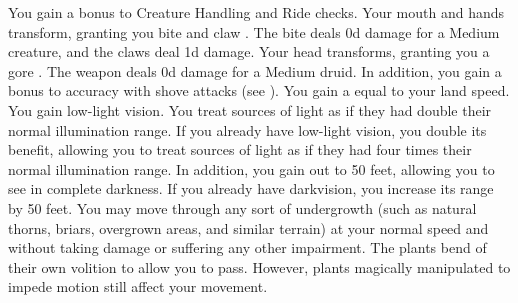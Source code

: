         You gain a  bonus to Creature Handling and Ride checks.
        Your mouth and hands transform, granting you bite and claw .
        The bite deals \plus0d damage for a Medium creature, and the claws deal \minus1d damage.
        Your head transforms, granting you a gore .
        The weapon deals \plus0d damage for a Medium druid.
        In addition, you gain a  bonus to accuracy with shove attacks (see ).
        You gain a  equal to your land speed.
        You gain low-light vision.
        You treat sources of light as if they had double their normal illumination range.
        If you already have low-light vision, you double its benefit, allowing you to treat sources of light as if they had four times their normal illumination range.
        In addition, you gain  out to 50 feet, allowing you to see in complete darkness.
        If you already have darkvision, you increase its range by 50 feet.
        You may move through any sort of undergrowth (such as natural thorns, briars, overgrown areas, and similar terrain) at your normal speed and without taking damage or suffering any other impairment.
        The plants bend of their own volition to allow you to pass.
        However, plants magically manipulated to impede motion still affect your movement.

